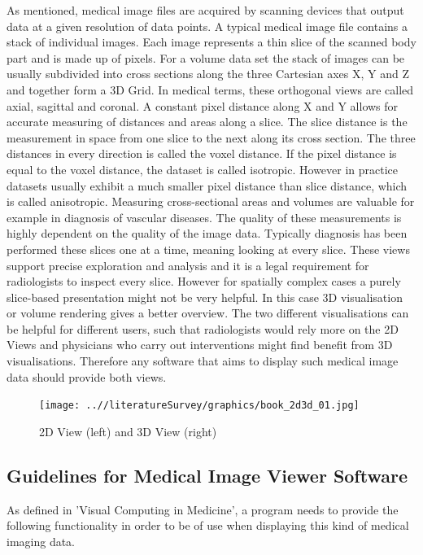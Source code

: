 \documentclass[a4paper,11pt,titlepage]{article}
\begin{document}
As mentioned, medical image files are acquired by scanning devices that output data at a given resolution of data points. A typical medical image file contains a stack of individual images. Each image represents a thin slice of the scanned body part and is made up of pixels. For a volume data set the stack of images can be usually subdivided into cross sections along the three Cartesian axes X, Y and Z and together form a 3D Grid. In medical terms, these orthogonal views are called axial, sagittal and coronal. A constant pixel distance along X and Y allows for accurate measuring of distances and areas along a slice. The slice distance is the measurement in space from one slice to the next along its cross section. The three distances in every direction is called the voxel distance. If the pixel distance is equal to the voxel distance, the dataset is called isotropic. However in practice datasets usually exhibit a much smaller pixel distance than slice distance, which is called anisotropic.
Measuring cross-sectional areas and volumes are valuable for example in diagnosis of vascular diseases. The quality of these measurements is highly dependent on the quality of the image data. Typically diagnosis has been performed these slices one at a time, meaning looking at every slice. These views support precise exploration and analysis and it is a legal requirement for radiologists to inspect every slice. However for spatially complex cases a purely slice-based presentation might not be very helpful. In this case 3D visualisation or volume rendering gives a better overview. The two different visualisations can be helpful for different users, such that radiologists would rely more on the 2D Views and physicians who carry out interventions might find benefit from 3D visualisations. Therefore any software that aims to display such medical image data should provide both views.


\begin{figure}[ht!]
\centering
\texttt{[image: ..//literatureSurvey/graphics/book\_2d3d\_01.jpg]}
\caption{2D View (left) and 3D View (right)}
\label{fig:UIdesign1}
\end{figure}



\subsection{Guidelines for Medical Image Viewer Software}

As defined in 'Visual Computing in Medicine'\cite{book}, a program needs to provide the following functionality in order to be of use when displaying this kind of medical imaging data. 
\end{document}
